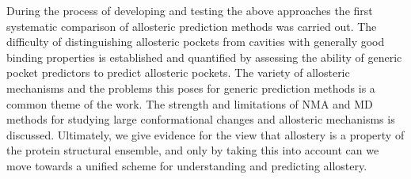 During the process of developing and testing the above approaches the first systematic comparison of allosteric prediction methods was carried out.
The difficulty of distinguishing allosteric pockets from cavities with generally good binding properties is established and quantified by assessing the ability of generic pocket predictors to predict allosteric pockets.
The variety of allosteric mechanisms \cite{Motlagh2014} and the problems this poses for generic prediction methods is a common theme of the work.
The strength and limitations of NMA and MD methods for studying large conformational changes and allosteric mechanisms is discussed.
Ultimately, we give evidence for the view that allostery is a property of the protein structural ensemble, and only by taking this into account can we move towards a unified scheme for understanding and predicting allostery.
